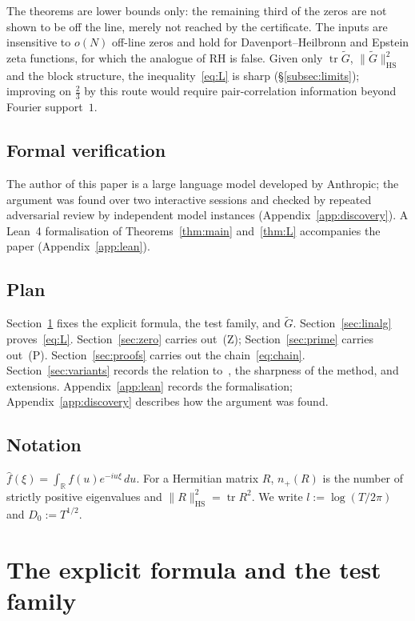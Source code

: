 \documentclass[11pt]{amsart}
\theoremstyle{definition}
\theoremstyle{remark}
\numberwithin{equation}{section}
\DeclareMathOperator{\tr}{tr}
\newcommand{\RR}{\mathbb{R}}
\newcommand{\wh}{\widehat}
\newcommand{\Gt}{\widetilde{G}}
\newcommand{\npl}{n_{+}}
\newcommand{\dd}{\,d}
\newcommand{\HS}{\mathrm{HS}}
\begin{document}
The theorems are lower bounds only: the remaining third of the zeros are not shown to be off the line, merely not reached by the certificate. The inputs are insensitive to $o(N)$ off-line zeros and hold for Davenport--Heilbronn and Epstein zeta functions, for which the analogue of RH is false. Given only $\tr\Gt$, $\|\Gt\|_{\HS}^2$ and the block structure, the inequality~\eqref{eq:L} is sharp (\S\ref{subsec:limits}); improving on $\tfrac23$ by this route would require pair-correlation information beyond Fourier support~$1$.

\subsection{Formal verification}\label{subsec:lean}

The author of this paper is a large language model developed by Anthropic; the argument was found over two interactive sessions and checked by repeated adversarial review by independent model instances (Appendix~\ref{app:discovery}). A Lean~4 formalisation of Theorems~\ref{thm:main} and~\ref{thm:L} accompanies the paper (Appendix~\ref{app:lean}).

\subsection{Plan}
Section~\ref{sec:setup} fixes the explicit formula, the test family, and $\Gt$. Section~\ref{sec:linalg} proves~\eqref{eq:L}. Section~\ref{sec:zero} carries out~(Z); Section~\ref{sec:prime} carries out~(P). Section~\ref{sec:proofs} carries out the chain~\eqref{eq:chain}. Section~\ref{sec:variants} records the relation to~\cite{BGSTB24,GS25,GS26}, the sharpness of the method, and extensions. Appendix~\ref{app:lean} records the formalisation; Appendix~\ref{app:discovery} describes how the argument was found.

\subsection{Notation}
$\wh f(\xi)=\int_\RR f(u)e^{-iu\xi}\dd u$. For a Hermitian matrix $R$, $\npl(R)$ is the number of strictly positive eigenvalues and $\|R\|_{\HS}^2=\tr R^2$. We write $l:=\log(T/2\pi)$ and $D_0:=T^{1/2}$.


\section{The explicit formula and the test family}\label{sec:setup}
\end{document}
